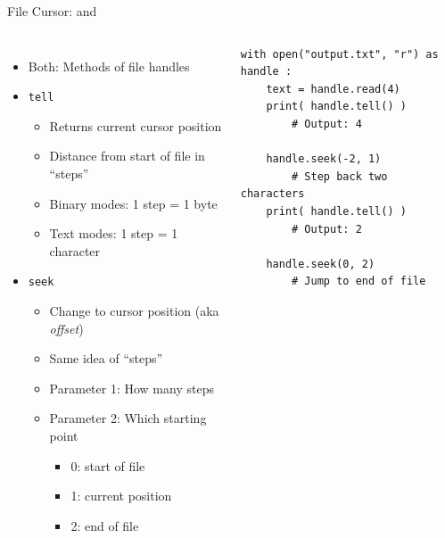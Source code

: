 \begin{frame}[fragile]{File Cursor:  and }
%
\begin{columns}[T]
\begin{itemize}
\item Both: Methods of file handles
\item	\texttt{tell}
	\begin{itemize}
	\item Returns current cursor position
	\item Distance from start of file in \enquote{steps}
	\item Binary modes: 1 step = 1 byte
	\item Text modes: 1 step = 1 character
	\end{itemize}
\item \texttt{seek}
	\begin{itemize}
	\item Change to cursor position (aka \emph{offset})
	\item Same idea of \enquote{steps}
	\item Parameter 1: How many steps
	\item Parameter 2: Which starting point
		\begin{itemize}
		\item 0: start of file
		\item 1: current position
		\item 2: end of file
		\end{itemize}
	\end{itemize}
\end{itemize}
%
\begin{codebox}
\begin{verbatim}
with open("output.txt", "r") as handle :
    text = handle.read(4)
    print( handle.tell() )
        # Output: 4
    
    handle.seek(-2, 1)
        # Step back two characters
    print( handle.tell() )
        # Output: 2
    
    handle.seek(0, 2)
        # Jump to end of file
\end{verbatim}
\end{codebox}
%
\end{columns}
%
\end{frame}


